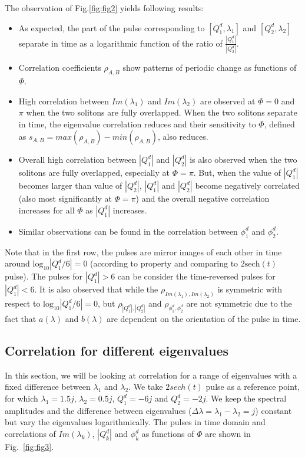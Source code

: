 \documentclass[9pt,twocolumn,twoside]{osajnl}
\begin{document}
The observation of Fig.\ref{fig:fig2} yields following results: 
\begin{itemize}[topsep=0pt,itemsep=0pt,partopsep=0pt,parsep=0pt]
    \item As expected, the part of the pulse corresponding to $[Q^d_1,\lambda_1]$ and $[Q^d_2,\lambda_2]$ separate in time as a logarithmic function of the ratio of $\frac{|Q^d_1|}{|Q^d_2|}$.
    \item Correlation coefficients $\rho_{A,B}$ show patterns of periodic change as functions of $\Phi$. 
    \item High correlation between $Im(\lambda_1)$ and $Im(\lambda_2)$ are observed at $\Phi=0$ and $\pi$ when the two solitons are fully overlapped. When the two solitons separate in time, the eigenvalue correlation reduces and their sensitivity to $\Phi$, defined as $s_{A,B}=max(\rho_{A,B})-min(\rho_{A,B})$, also reduces.
    \item Overall high correlation between $|Q^d_1|$ and $|Q^d_2|$ is also observed when the two solitons are fully overlapped, especially at $\Phi=\pi$. But, when the value of $|Q^d_1|$ becomes larger than value of $|Q^d_2|$, $|Q^d_1|$ and $|Q^d_2|$ become negatively correlated (also most significantly at $\Phi=\pi$) and the overall negative correlation increases for all $\Phi$ as $|Q^d_1|$ increases.
    \item Similar observations can be found in the correlation between $\phi^d_1$ and $\phi^d_2$. 
\end{itemize}
Note that in the first row, the pulses are mirror images of each other in time around $\text{log}_{10}|Q^d_1/6|=0$ (according to property  and comparing to $2\text{sech}(t)$ pulse). The pulses for $|Q^d_1|>6$ can be consider the time-reversed pulses for $|Q^d_1|<6$. It is also observed that while the $\rho_{Im(\lambda_1),Im(\lambda_2)}$ is symmetric with respect to $\text{log}_{10}|Q^d_1/6|=0$, but $\rho_{|Q^d_1|,|Q^d_2|}$ and $\rho_{\phi^d_1,\phi^d_2}$ are not symmetric due to the fact that $a(\lambda)$ and $b(\lambda)$ are dependent on the orientation of the pulse in time.

\subsection{Correlation for different eigenvalues}
In this section, we will be looking at correlation for a range of eigenvalues with a fixed difference between $\lambda_1$ and $\lambda_2$. We take $2sech(t)$ pulse as a reference point, for which $\lambda_1=1.5j$, $\lambda_2=0.5j$, $Q^d_1=-6j$ and $Q^d_2=-2j$. We keep the spectral amplitudes and the difference between eigenvalues ($\Delta\lambda=\lambda_1-\lambda_2=j$) constant but vary the eigenvalues logarithmically. The pulses in time domain and correlations of $Im(\lambda_k)$, $|Q^d_k|$ and $\phi^d_k$ as functions of $\Phi$ are shown in Fig.~\ref{fig:fig3}. 
\end{document}
